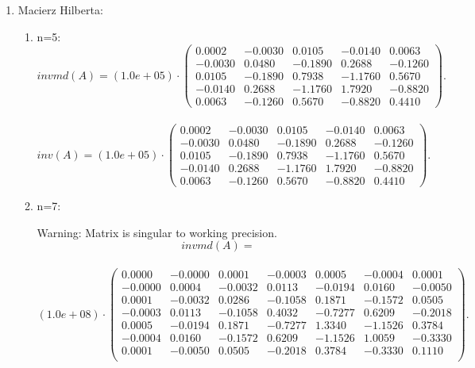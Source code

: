 \documentclass[12pt]{article}
\begin{document}
\begin{enumerate}
\item Macierz Hilberta:
\begin{enumerate}
\item n=5:
\\
\[
invmd(A)=\left(1.0e+05\right) \cdot \begin{pmatrix}
0.0002 & -0.0030 & 0.0105 & -0.0140 & 0.0063 \\
-0.0030 & 0.0480 & -0.1890 & 0.2688 & -0.1260 \\
0.0105 & -0.1890 & 0.7938 & -1.1760 & 0.5670 \\
-0.0140 & 0.2688 & -1.1760 & 1.7920 & -0.8820 \\
0.0063 & -0.1260  & 0.5670 & -0.8820 & 0.4410
\end{pmatrix}.
\]
\\
\[
inv(A)=\left(1.0e+05\right) \cdot \begin{pmatrix}
0.0002 & -0.0030 & 0.0105 & -0.0140 & 0.0063 \\
-0.0030 & 0.0480 & -0.1890 & 0.2688 & -0.1260 \\
0.0105 & -0.1890 & 0.7938 & -1.1760 & 0.5670 \\
-0.0140 & 0.2688 & -1.1760 & 1.7920 & -0.8820 \\
0.0063 & -0.1260  & 0.5670 & -0.8820 & 0.4410
\end{pmatrix}.
\]
\item n=7:

Warning: Matrix is singular to working precision.
\[
invmd(A)=\]
\\
\[\left(1.0e+08\right) \cdot \begin{pmatrix}
0.0000 & -0.0000 & 0.0001 & -0.0003 & 0.0005 & -0.0004 & 0.0001 \\
-0.0000 & 0.0004 & -0.0032 & 0.0113 & -0.0194 & 0.0160 & -0.0050 \\
0.0001 & -0.0032 & 0.0286 & -0.1058 & 0.1871 & -0.1572 & 0.0505 \\
-0.0003 & 0.0113 & -0.1058 & 0.4032 & -0.7277 & 0.6209 & -0.2018 \\
0.0005 & -0.0194  & 0.1871 & -0.7277 & 1.3340 & -1.1526 & 0.3784 \\
-0.0004 & 0.0160 & -0.1572 & 0.6209 & -1.1526 & 1.0059 & -0.3330\\
0.0001 & -0.0050 & 0.0505 & -0.2018 & 0.3784 & -0.3330 & 0.1110\\
\end{pmatrix}.
\]
\\


\end{enumerate}
\end{enumerate}
\end{document}
